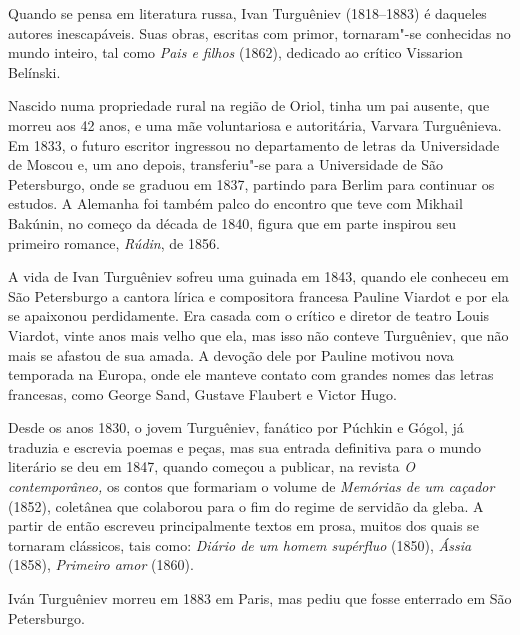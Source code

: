 \noindent{}Quando se pensa em literatura russa, Ivan Turguêniev (1818--1883) é
daqueles autores inescapáveis. Suas obras, escritas com primor,
tornaram"-se conhecidas no mundo inteiro, tal como \emph{Pais e filhos}
(1862), dedicado ao crítico Vissarion Belínski.


Nascido numa propriedade rural na região de Oriol, tinha um pai ausente,
que morreu aos 42 anos, e uma mãe voluntariosa e autoritária, Varvara
Turguênieva. Em 1833, o futuro escritor ingressou no
departamento de letras da Universidade de Moscou e, um ano depois,
transferiu"-se para a Universidade de São Petersburgo, onde se graduou em
1837, partindo para Berlim para continuar os estudos. A Alemanha foi
também palco do encontro que teve com Mikhail Bakúnin, no começo da
década de 1840, figura que em parte inspirou seu primeiro
romance, \emph{Rúdin}, de 1856.

A vida de Ivan Turguêniev sofreu uma guinada em 1843, quando ele
conheceu em São Petersburgo a cantora lírica e compositora francesa
Pauline Viardot e por ela se apaixonou perdidamente. Era casada com o
crítico e diretor de teatro Louis Viardot, vinte anos mais velho que
ela, mas isso não conteve Turguêniev, que não mais se afastou de sua
amada. A devoção dele por Pauline motivou nova temporada na Europa, onde
ele manteve contato com grandes nomes das letras francesas, como George
Sand, Gustave Flaubert e Victor Hugo.

Desde os anos 1830, o jovem Turguêniev, fanático por Púchkin e Gógol, já traduzia e
escrevia poemas e peças, mas sua entrada definitiva para o mundo
literário se deu em 1847, quando começou a publicar, na revista \emph{O
contemporâneo,} os contos que formariam o volume de \emph{Memórias de um
caçador} (1852), coletânea que colaborou para o fim do regime de
servidão da gleba. A partir de então escreveu principalmente
textos em prosa, muitos dos quais se tornaram clássicos, tais como:
\emph{Diário de um homem supérfluo} (1850), \emph{Ássia} (1858), \emph{Primeiro amor} (1860).

Iván Turguêniev morreu em 1883 em Paris, mas pediu que fosse enterrado
em São Petersburgo.

